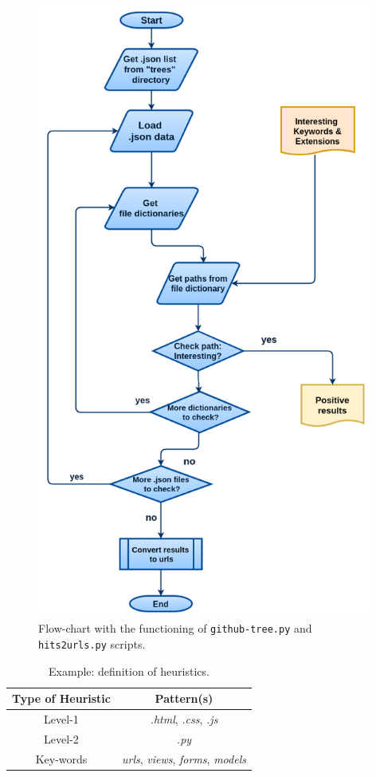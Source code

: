 \documentclass[a4paper, 12pt]{book}
\begin{document}
\begin{figure}
  \centering
  \includegraphics[width=11cm, keepaspectratio]{img/github-tree}
  \caption{Flow-chart with the functioning of \texttt{github-tree.py} and \texttt{hits2urls.py} scripts.}
  \label{fig:gh-tree-diagram}
\end{figure}
\begin{table}[]
\centering
\caption{Example: definition of heuristics.}
\label{table:heuristics-table-example}
\begin{tabular}{|c|c|}
\hline
\textbf{Type of Heuristic} & \textbf{Pattern(s)}                                            \\ \hline
Level-1                    & \textit{.html}, \textit{.css}, \textit{.js}                    \\ \hline
Level-2                    & \textit{.py}                                                   \\ \hline
Key-words                  & \textit{urls}, \textit{views}, \textit{forms}, \textit{models} \\ \hline
\end{tabular}
\end{table}
\end{document}
